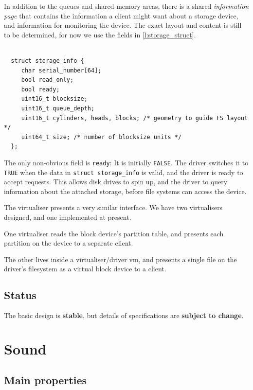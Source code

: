\documentclass[a4paper,12pt]{report}
\newcommand{\code}[1]{\texttt{#1}}
\begin{document}
In addition to the queues and shared-memory areas, there is a shared
\emph{information page} that contains the information a client might
want about a storage device, and information for monitoring the
device.  The exact layout and content is still to be determined, for
now we use the fields in \autoref{l:storage_struct}.

\begin{lstlisting}[gobble=2,firstline=2,float=th,
  label={l:storage_struct},
  caption={Storage information region data structure.}]

  struct storage_info {
     char serial_number[64];
     bool read_only;
     bool ready;
     uint16_t blocksize;
     uint16_t queue_depth;
     uint16_t cylinders, heads, blocks; /* geometry to guide FS layout */
     uint64_t size; /* number of blocksize units */
  };
\end{lstlisting}

The only non-obvious field is \code{ready}: It is initially
\code{FALSE}. The driver switches it to \code{TRUE} when the data in
\code{struct storage\_info} is valid, and the driver is
ready to accept requests.  This allows disk drives to spin up, and the
driver to query information about the attached storage, before
file systems can access the device.

The virtualiser presents a very similar interface.  We have two
virtualisers designed, and one implemented at present.

One virtualiser reads the block device's partition table, and presents
each partition on the device to a separate client.

The other lives inside a virtualiser/driver \gls{vm}, and presents a single
file on the driver's filesystem as a virtual block device to a client.

\subsection{Status}

The basic design is \textbf{stable}, but details of specifications are
\textbf{subject to change}.

\section{Sound}

\subsection{Main properties}
\end{document}
